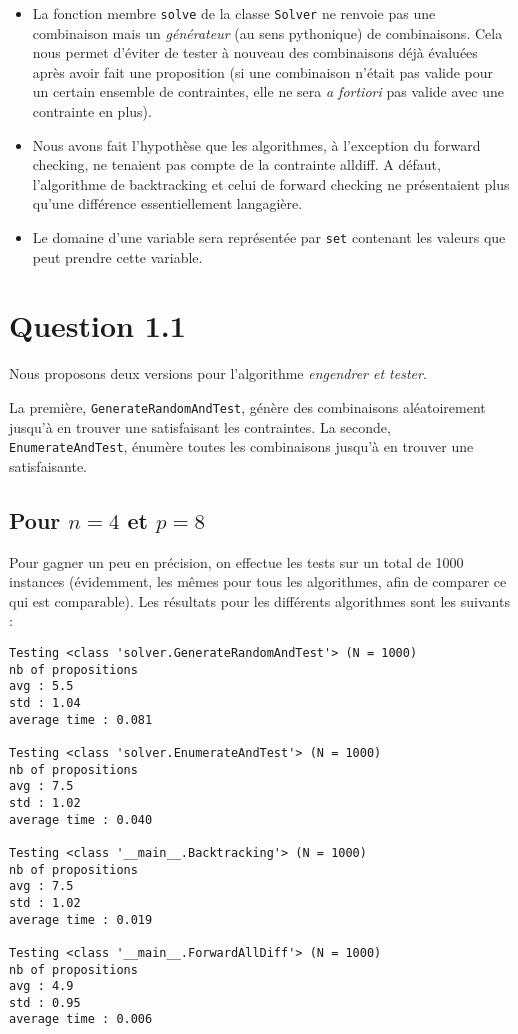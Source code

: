 \documentclass[a4paper, 12pt]{report}
\newcommand{\py}[1]{\texttt{#1}}
\begin{document}
\begin{itemize}
	\item La fonction membre \py{solve} de la classe \py{Solver} ne renvoie pas une combinaison mais un \textit{générateur} (au sens pythonique) de combinaisons. Cela nous permet d'éviter de tester à nouveau des combinaisons déjà évaluées après avoir fait une proposition (si une combinaison n'était pas valide pour un certain ensemble de contraintes, elle ne sera \textit{a fortiori} pas valide avec une contrainte en plus).

	\item Nous avons fait l'hypothèse que les algorithmes, à l'exception du forward checking, ne tenaient pas compte de la contrainte alldiff. A défaut, l'algorithme de backtracking et celui de forward checking ne présentaient plus qu'une différence essentiellement langagière.
		
	\item Le domaine d'une variable sera représentée par \py{set} contenant les valeurs que peut prendre cette variable.
\end{itemize}



\section*{Question 1.1}

Nous proposons deux versions pour l'algorithme \textit{engendrer et tester}.

La première, \py{GenerateRandomAndTest}, génère des combinaisons aléatoirement jusqu'à en trouver une satisfaisant les contraintes. La seconde, \py{EnumerateAndTest}, énumère toutes les combinaisons jusqu'à en trouver une satisfaisante. \\

\subsection*{Pour $n = 4$ et $p = 8$}

Pour gagner un peu en précision, on effectue les tests sur un total de 1000 instances (évidemment, les mêmes pour tous les algorithmes, afin de comparer ce qui est comparable).
Les résultats pour les différents algorithmes sont les suivants :

\begin{verbatim}
Testing <class 'solver.GenerateRandomAndTest'> (N = 1000)
nb of propositions
avg : 5.5
std : 1.04
average time : 0.081

Testing <class 'solver.EnumerateAndTest'> (N = 1000)
nb of propositions
avg : 7.5
std : 1.02
average time : 0.040

Testing <class '__main__.Backtracking'> (N = 1000)
nb of propositions
avg : 7.5
std : 1.02
average time : 0.019

Testing <class '__main__.ForwardAllDiff'> (N = 1000)
nb of propositions
avg : 4.9
std : 0.95
average time : 0.006
\end{verbatim}
\end{document}

